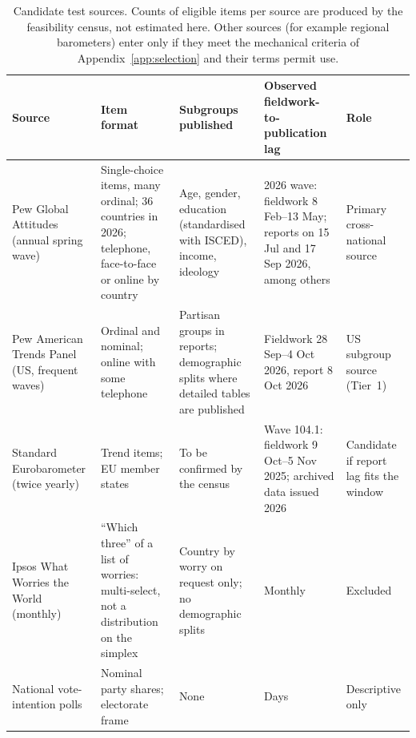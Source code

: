 \documentclass[11pt]{article}
\begin{document}
\begin{table}[t]
\centering
\small
\begin{tabular}{@{}L{2.6cm}L{3.2cm}L{3.3cm}L{3.6cm}L{2.0cm}@{}}
\toprule
Source & Item format & Subgroups published & Observed fieldwork-to-publication lag & Role \\
\midrule
Pew Global Attitudes (annual spring wave) & Single-choice items, many ordinal; 36 countries in 2026; telephone, face-to-face or online by country & Age, gender, education (standardised with ISCED), income, ideology & 2026 wave: fieldwork 8 Feb--13 May; reports on 15 Jul and 17 Sep 2026, among others \citep{pew2026china,pew2026ai} & Primary cross-national source \\
Pew American Trends Panel (US, frequent waves) & Ordinal and nominal; online with some telephone \citep{pew2026china} & Partisan groups in reports; demographic splits where detailed tables are published & Fieldwork 28 Sep--4 Oct 2026, report 8 Oct 2026 \citep{pew2026midterms} & US subgroup source (Tier~1) \\
Standard Eurobarometer (twice yearly) & Trend items; EU member states & To be confirmed by the census & Wave 104.1: fieldwork 9 Oct--5 Nov 2025; archived data issued 2026 \citep{eb104} & Candidate if report lag fits the window \\
Ipsos What Worries the World (monthly) & ``Which three'' of a list of worries: multi-select, not a distribution on the simplex & Country by worry on request only; no demographic splits & Monthly \citep{ipsos2026worries} & Excluded \\
National vote-intention polls & Nominal party shares; electorate frame & None & Days & Descriptive only \\
\bottomrule
\end{tabular}
\caption{Candidate test sources. Counts of eligible items per source are produced by the feasibility census, not estimated here. Other sources (for example regional barometers) enter only if they meet the mechanical criteria of Appendix~\ref{app:selection} and their terms permit use.}
\label{tab:feas}
\end{table}
\end{document}
